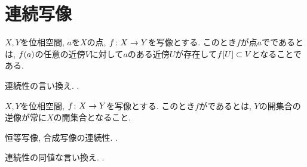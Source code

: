\documentclass[uplatex, dvipdfmx, a4paper, 12pt, class=jsbook, crop=false]{standalone}
\begin{document}
\section{連続写像}
\label{sec:continuous-maps}

\begin{definition}
	$ X, Y $を位相空間, $ a $を$ X $の点, $ f\colon X\to Y $を写像とする.
	このとき$ f $が点$ a $でであるとは, $ \mappt{f}{a} $の任意の近傍$ V $に対して$ a $のある近傍$ U $が存在して$ \mapset{f}{U} \subset V $となることである.
\end{definition}

\begin{proposition}
	連続性の言い換え.
	\WIP.
\end{proposition}

\begin{definition}
	$ X, Y $を位相空間, $ f\colon X\to Y $を写像とする.
	このとき$ f $がであるとは, $ Y $の開集合の逆像が常に$ X $の開集合となること.
\end{definition}

恒等写像, 合成写像の連続性.
\WIP.

\begin{proposition}
	連続性の同値な言い換え.
	\WIP.
\end{proposition}
\end{document}

